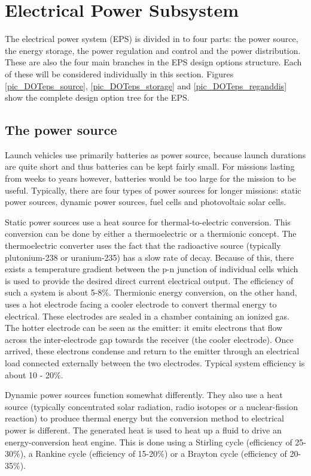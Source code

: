 \section{Electrical Power Subsystem}
\label{blDOEPS}

The electrical power system (EPS) is divided in to four parts: the power source, the energy storage, the power regulation and control and the power distribution. These are also the four main branches in the EPS design options structure. Each of these will be considered individually in this section. Figures \ref{pic_DOTeps_source}, \ref{pic_DOTeps_storage} and \ref{pic_DOTeps_reganddis} show the complete design option tree for the EPS.

\subsection{The power source}
\label{blDOsource}

Launch vehicles use primarily batteries as power source, because launch durations are quite short and thus batteries can be kept fairly small. 
For missions lasting from weeks to years however, batteries would be too large for the mission to be useful.
Typically, there are four types of power sources for longer missions: static power sources, dynamic power sources, fuel cells and photovoltaic solar cells.

Static power sources use a heat source for thermal-to-electric conversion. This conversion can be done by either a thermoelectric or a thermionic
concept. The thermoelectric converter uses the fact that the radioactive source (typically plutonium-238 or uranium-235) has a slow rate of decay.
Because of this, there exists a temperature gradient between the p-n junction of individual cells which is used to provide the desired direct current electrical output. The efficiency of such a system is about 5-8\%.
Thermionic energy conversion, on the other hand, uses a hot electrode facing a cooler electrode to convert thermal energy to electrical.
These electrodes are sealed in a chamber containing an ionized gas. The hotter electrode can be seen as the emitter: it emits electrons that flow
across the inter-electrode gap towards the receiver (the cooler electrode). Once arrived, these electrons condense and return to the emitter through an electrical load connected externally between the two electrodes. Typical system efficiency is about 10 - 20\%.

Dynamic power sources function somewhat differently. They also use a heat source (typically concentrated solar radiation, radio isotopes or a nuclear-fission reaction) to produce thermal energy but the conversion method to electrical power is different. The generated heat is used to heat up a fluid to drive an energy-conversion heat engine. This is done using a Stirling cycle (efficiency of 25-30\%), a Rankine cycle (efficiency of 15-20\%) or a Brayton cycle (efficiency of 20-35\%).

